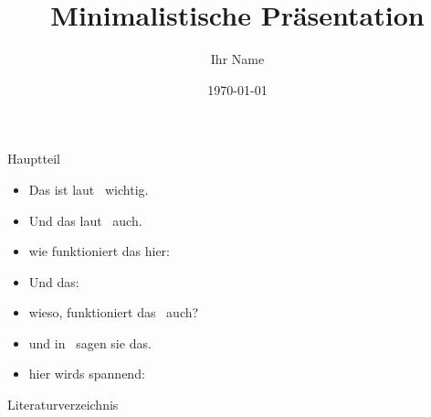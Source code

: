 \documentclass[aspectratio=169]{beamer} %
\title{Minimalistische Präsentation}
\author{Ihr Name}\date{\today}
\begin{document}
    \begin{frame}{Hauptteil}
        \begin{itemize}
            \item Das ist laut~\cite{Zweig.1964b} wichtig.
            \item Und das laut~\cite{Zweig.1964} auch.
            \item wie funktioniert das hier:~\cite{Wikipedia.Standardmodell}
            \item Und das:~\cite{Wikipedia.Hadron}
            \item wieso, funktioniert das~\cite{GellMann.1964} auch?
            \item und in~\cite{C.Amsler.2017} sagen sie das.
            \item hier wirds spannend:~\cite{Aaij.2015}
        \end{itemize}
    \end{frame}

    \begin{frame}[allowframebreaks]{Literaturverzeichnis}
        \printbibliography\end{frame}
\end{document}
